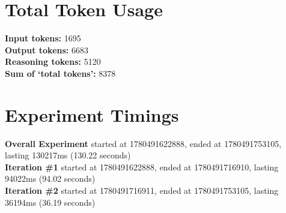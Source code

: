 \documentclass{article}
\begin{document}
\section*{Total Token Usage}
\textbf{Input tokens: }1695
\\\textbf{Output tokens: }6683
\\\textbf{Reasoning tokens: }5120
\\\textbf{Sum of `total tokens': }8378
\section*{Experiment Timings}
\textbf{Overall Experiment} started at 1780491622888, ended at 1780491753105, lasting 130217ms (130.22 seconds)
\\\textbf{Iteration \#1} started at 1780491622888, ended at 1780491716910, lasting 94022ms (94.02 seconds)
\\\textbf{Iteration \#2} started at 1780491716911, ended at 1780491753105, lasting 36194ms (36.19 seconds)
\end{document}
